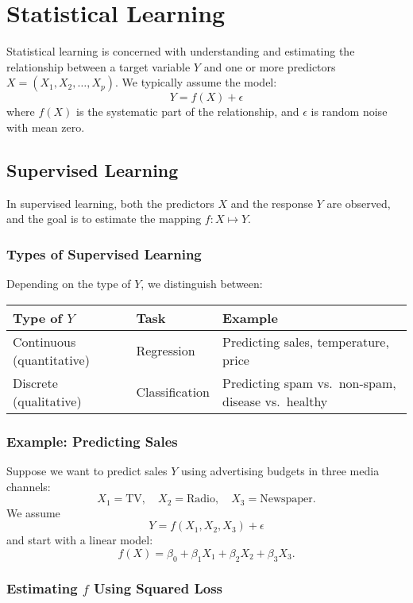 \section{Statistical Learning}

Statistical learning is concerned with understanding and estimating the relationship between a target variable \( Y \) and one or more predictors \( X = (X_1, X_2, \ldots, X_p) \).  
We typically assume the model:
\[
Y = f(X) + \epsilon
\]
where \( f(X) \) is the systematic part of the relationship, and \( \epsilon \) is random noise with mean zero.

\subsection{Supervised Learning}

In supervised learning, both the predictors \( X \) and the response \( Y \) are observed, and the goal is to estimate the mapping \( f: X \mapsto Y \).

\subsubsection{Types of Supervised Learning}
Depending on the type of \( Y \), we distinguish between:

\begin{center}
\begin{tabular}{@{}lll@{}}
\toprule
Type of \( Y \) & Task & Example \\
\midrule
Continuous (quantitative) & Regression & Predicting sales, temperature, price \\
Discrete (qualitative) & Classification & Predicting spam vs.\ non-spam, disease vs.\ healthy \\
\bottomrule
\end{tabular}
\end{center}

\subsubsection{Example: Predicting Sales}
Suppose we want to predict sales \( Y \) using advertising budgets in three media channels:
\[
X_1 = \text{TV}, \quad X_2 = \text{Radio}, \quad X_3 = \text{Newspaper.}
\]
We assume
\[
Y = f(X_1, X_2, X_3) + \epsilon
\]
and start with a linear model:
\[
f(X) = \beta_0 + \beta_1 X_1 + \beta_2 X_2 + \beta_3 X_3.
\]

\subsubsection{Estimating \( f \) Using Squared Loss}

